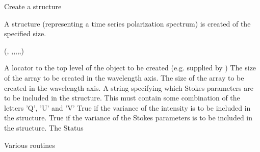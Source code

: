\begin{manroutinedescription}
     Create a {} {} structure

     A {} {} structure (representing a time series %
polarization spectrum) is
     created of the specified size.

     {}

     {} {} ({},{%
},{},{},{},{},{})

\begin{manparametertable}
 A locator %
to the
                       top level of the object to
                       be created (e.g. supplied by {})
 The size of the %
array to be created
                       in the wavelength axis.
 The size of the %
array to be created
                       in the wavelength axis.
 A string %
specifying which
                       Stokes parameters are to be included in the
                       structure. This must contain some combination
                       of the letters 'Q', 'U' and 'V'
 True if the %
variance of the intensity
                       is to be included in the structure.
 True if the %
variance of the Stokes
                       parameters is to be included in the structure.
 The Status

\end{manparametertable}
     Various {} routines
\end{manroutinedescription}
